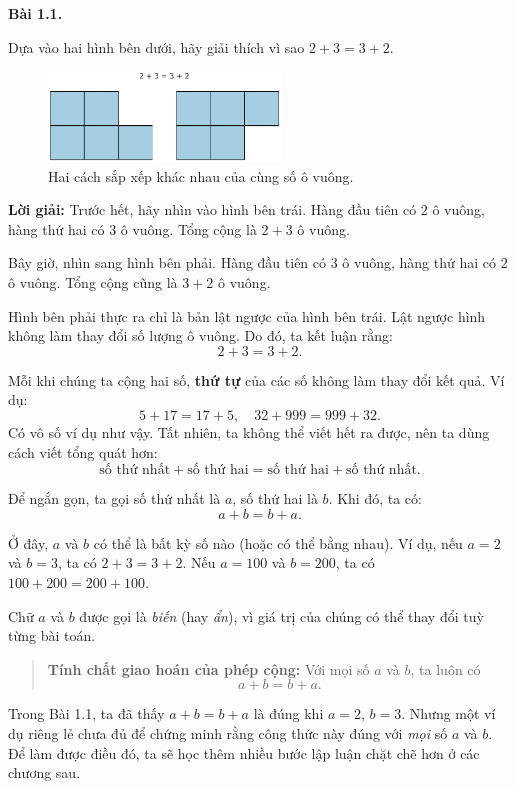 \documentclass[12pt,a4paper]{book}
\newenvironment{problem}[1][]{
  \par\noindent\textbf{Bài #1.}\ \ignorespaces
}{\par}
\begin{document}
\begin{problem}[1.1]
Dựa vào hai hình bên dưới, hãy giải thích vì sao $2 + 3 = 3 + 2$.

\begin{figure}[h!]
  \centering
  \includegraphics[width=0.55\textwidth]{img/fig-prob1.1.pdf}
  \caption*{\small Hai cách sắp xếp khác nhau của cùng số ô vuông.}
\end{figure}

\textbf{Lời giải:}  
Trước hết, hãy nhìn vào hình bên trái. Hàng đầu tiên có $2$ ô vuông, hàng thứ hai có $3$ ô vuông.  
Tổng cộng là $2 + 3$ ô vuông.  

Bây giờ, nhìn sang hình bên phải. Hàng đầu tiên có $3$ ô vuông, hàng thứ hai có $2$ ô vuông.  
Tổng cộng cũng là $3 + 2$ ô vuông.  

Hình bên phải thực ra chỉ là bản lật ngược của hình bên trái.  
Lật ngược hình không làm thay đổi số lượng ô vuông.  
Do đó, ta kết luận rằng:
\[
2 + 3 = 3 + 2.
\]
\end{problem}

Mỗi khi chúng ta cộng hai số, \textbf{thứ tự} của các số không làm thay đổi kết quả.  
Ví dụ:
\[
5 + 17 = 17 + 5, \quad 32 + 999 = 999 + 32.
\]
Có vô số ví dụ như vậy.  
Tất nhiên, ta không thể viết hết ra được, nên ta dùng cách viết tổng quát hơn:
\[
\text{số thứ nhất} + \text{số thứ hai} = \text{số thứ hai} + \text{số thứ nhất.}
\]

Để ngắn gọn, ta gọi số thứ nhất là $a$, số thứ hai là $b$.  
Khi đó, ta có:
\[
a + b = b + a.
\]

Ở đây, $a$ và $b$ có thể là bất kỳ số nào (hoặc có thể bằng nhau).  
Ví dụ, nếu $a = 2$ và $b = 3$, ta có $2 + 3 = 3 + 2$.  
Nếu $a = 100$ và $b = 200$, ta có $100 + 200 = 200 + 100$.  

Chữ $a$ và $b$ được gọi là \emph{biến} (hay \emph{ẩn}), vì giá trị của chúng có thể thay đổi tuỳ từng bài toán.

\begin{quote}
\textbf{Tính chất giao hoán của phép cộng:}  
Với mọi số $a$ và $b$, ta luôn có
\[
a + b = b + a.
\]
\end{quote}

Trong Bài 1.1, ta đã thấy $a + b = b + a$ là đúng khi $a = 2$, $b = 3$.  
Nhưng một ví dụ riêng lẻ chưa đủ để chứng minh rằng công thức này đúng với \emph{mọi} số $a$ và $b$.  
Để làm được điều đó, ta sẽ học thêm nhiều bước lập luận chặt chẽ hơn ở các chương sau.
\end{document}
